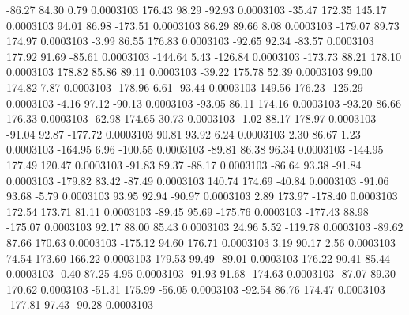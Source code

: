       -86.27       84.30        0.79     0.0003103
      176.43       98.29      -92.93     0.0003103
      -35.47      172.35      145.17     0.0003103
       94.01       86.98     -173.51     0.0003103
       86.29       89.66        8.08     0.0003103
     -179.07       89.73      174.97     0.0003103
       -3.99       86.55      176.83     0.0003103
      -92.65       92.34      -83.57     0.0003103
      177.92       91.69      -85.61     0.0003103
     -144.64        5.43     -126.84     0.0003103
     -173.73       88.21      178.10     0.0003103
      178.82       85.86       89.11     0.0003103
      -39.22      175.78       52.39     0.0003103
       99.00      174.82        7.87     0.0003103
     -178.96        6.61      -93.44     0.0003103
      149.56      176.23     -125.29     0.0003103
       -4.16       97.12      -90.13     0.0003103
      -93.05       86.11      174.16     0.0003103
      -93.20       86.66      176.33     0.0003103
      -62.98      174.65       30.73     0.0003103
       -1.02       88.17      178.97     0.0003103
      -91.04       92.87     -177.72     0.0003103
       90.81       93.92        6.24     0.0003103
        2.30       86.67        1.23     0.0003103
     -164.95        6.96     -100.55     0.0003103
      -89.81       86.38       96.34     0.0003103
     -144.95      177.49      120.47     0.0003103
      -91.83       89.37      -88.17     0.0003103
      -86.64       93.38      -91.84     0.0003103
     -179.82       83.42      -87.49     0.0003103
      140.74      174.69      -40.84     0.0003103
      -91.06       93.68       -5.79     0.0003103
       93.95       92.94      -90.97     0.0003103
        2.89      173.97     -178.40     0.0003103
      172.54      173.71       81.11     0.0003103
      -89.45       95.69     -175.76     0.0003103
     -177.43       88.98     -175.07     0.0003103
       92.17       88.00       85.43     0.0003103
       24.96        5.52     -119.78     0.0003103
      -89.62       87.66      170.63     0.0003103
     -175.12       94.60      176.71     0.0003103
        3.19       90.17        2.56     0.0003103
       74.54      173.60      166.22     0.0003103
      179.53       99.49      -89.01     0.0003103
      176.22       90.41       85.44     0.0003103
       -0.40       87.25        4.95     0.0003103
      -91.93       91.68     -174.63     0.0003103
      -87.07       89.30      170.62     0.0003103
      -51.31      175.99      -56.05     0.0003103
      -92.54       86.76      174.47     0.0003103
     -177.81       97.43      -90.28     0.0003103
